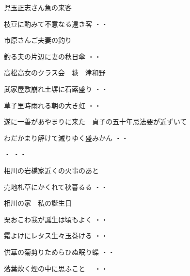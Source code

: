 \vspace{0.6cm}
児玉正志さん急の来客
\begin{shiika}枝豆に酌みて不意なる遠き客
\hfill{・・}\end{shiika}
\vspace{0.6cm}
市原さんご夫妻の釣り
\begin{shiika}釣る夫の片辺に妻の秋日傘
\hfill{・・}\end{shiika}
\vspace{0.6cm}
高松高女のクラス会　萩　津和野
\begin{shiika}武家屋敷崩れ土塀に石蕗盛り
\hfill{・・}\end{shiika}
\begin{shiika}草子里時雨れる朝の大き虹
\hfill{・・}\end{shiika}
\vspace{0.6cm}
遂に一善があやまりに来た　貞子の五十年忌法要が近ずいて
\begin{shiika}わだかまり解けて減りゆく盛みかん
\hfill{・・}\end{shiika}
\vspace{0.6cm}
\begin{shiika}・
\hfill{・・}\end{shiika}
\vspace{0.6cm}
相川の岩橋家近くの火事のあと
\begin{shiika}売地札草にかくれて秋暮るる
\hfill{・・}\end{shiika}
\vspace{0.6cm}
相川の家　私の誕生日
\begin{shiika}栗おこわ我が誕生は頃もよく
\hfill{・・}\end{shiika}
\begin{shiika}霜よけにレタス生々玉巻ける
\hfill{・・}\end{shiika}
\begin{shiika}供華の菊剪りためらひぬ眠り蝶
\hfill{・・}\end{shiika}
\vspace{0.6cm}
\begin{shiika}落葉炊く煙の中に思ふこと　
\hfill{・・}\end{shiika}

